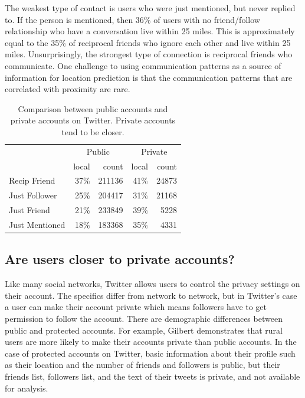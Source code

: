 \documentclass[letterpaper]{article}
\begin{document}
The weakest type of contact is users who were just mentioned, but never
replied to.
%
If the person is mentioned, then 36\% of users with no
friend/follow relationship who have a conversation live within 25 miles.
%
This is approximately equal to the 35\% of reciprocal friends who ignore each
other and live within 25 miles.
%
Unsurprisingly, the strongest type of connection is reciprocal friends who
communicate.
%
One challenge to using communication patterns as a source of information for
location prediction is that the communication patterns that are correlated
with proximity are rare.

\begin{table}[tbh]
\centering
\begin{tabular}{l | r r | r r}
    & \multicolumn{2}{c}{Public}
    & \multicolumn{2}{|c}{Private} \\
    \cline{2-5}
    &local&count&local&count \\
    \hline
    Recip Friend & 37\%&211136 & 41\%&24873 \\
    Just Follower & 25\%&204417 & 31\%&21168 \\
    Just Friend & 21\%&233849 & 39\%&5228 \\
    Just Mentioned & 18\%&183368 & 35\%&4331 \\
\end{tabular}
\caption{
    Comparison between public accounts and private accounts on Twitter.
    Private accounts tend to be closer.
}
\label{tab:EdgeTypesProt}
\end{table}

\subsection{Are users closer to private accounts?}

Like many social networks, Twitter allows users to control the privacy settings
on their account.
%
The specifics differ from network to network, but in Twitter's case
a user can make their account private which means followers have to get
permission to follow the account.
%
There are demographic differences between public and protected accounts.
%
For example, Gilbert \cite{gilbert2008network} demonstrates that rural users
are more likely to make their accounts private than public accounts.
%
In the case of protected accounts on Twitter, basic information
about their profile such as their location and the number of friends and
followers is public, but their friends list, followers list, and the text of
their tweets is private, and not available for analysis.
\end{document}
